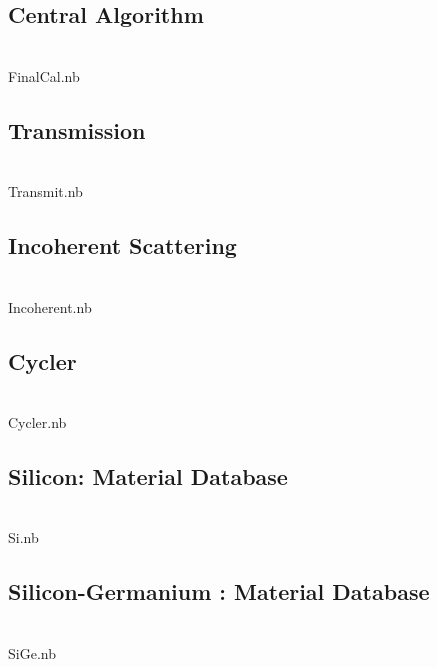 \begin{figure}[h]
\subsection{Central Algorithm}
\\FinalCal.nb
\end{figure}

\begin{figure}[h]
\subsection{Transmission}
\\Transmit.nb
\end{figure}

\begin{figure}[h]
\subsection{Incoherent Scattering}
\\Incoherent.nb
\end{figure}

\begin{figure}[h]
\subsection{Cycler}
\\Cycler.nb
\end{figure}

\begin{figure}[h]
\subsection{Silicon: Material Database}
\\Si.nb
\end{figure}

\begin{figure}[h]
\subsection{Silicon-Germanium : Material Database}
\\SiGe.nb
\end{figure}

